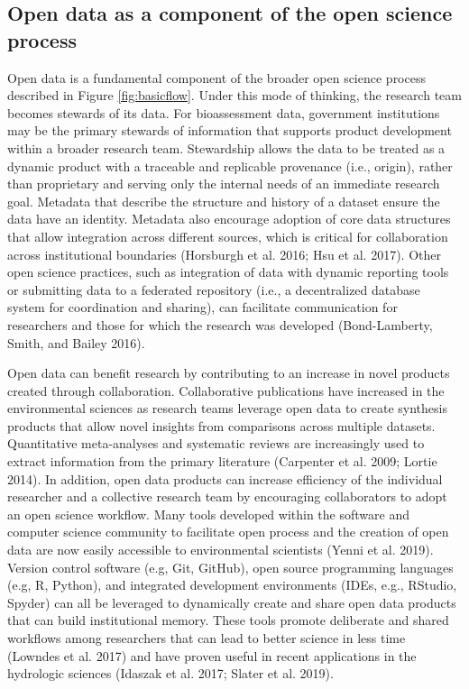 \documentclass[fleqn,10pt,lineno]{wlpeerj} %
\begin{document}
\hypertarget{open-data-as-a-component-of-the-open-science-process}{%
\subsection{Open data as a component of the open science process}\label{open-data-as-a-component-of-the-open-science-process}}

Open data is a fundamental component of the broader open science process described in Figure \ref{fig:basicflow}. Under this mode of thinking, the research team becomes stewards of its data. For bioassessment data, government institutions may be the primary stewards of information that supports product development within a broader research team. Stewardship allows the data to be treated as a dynamic product with a traceable and replicable provenance (i.e., origin), rather than proprietary and serving only the internal needs of an immediate research goal. Metadata that describe the structure and history of a dataset ensure the data have an identity. Metadata also encourage adoption of core data structures that allow integration across different sources, which is critical for collaboration across institutional boundaries (Horsburgh et al. 2016; Hsu et al. 2017). Other open science practices, such as integration of data with dynamic reporting tools or submitting data to a federated repository (i.e., a decentralized database system for coordination and sharing), can facilitate communication for researchers and those for which the research was developed (Bond-Lamberty, Smith, and Bailey 2016).

Open data can benefit research by contributing to an increase in novel products created through collaboration. Collaborative publications have increased in the environmental sciences as research teams leverage open data to create synthesis products that allow novel insights from comparisons across multiple datasets. Quantitative meta-analyses and systematic reviews are increasingly used to extract information from the primary literature (Carpenter et al. 2009; Lortie 2014). In addition, open data products can increase efficiency of the individual researcher and a collective research team by encouraging collaborators to adopt an open science workflow. Many tools developed within the software and computer science community to facilitate open process and the creation of open data are now easily accessible to environmental scientists (Yenni et al. 2019). Version control software (e.g, Git, GitHub), open source programming languages (e.g, R, Python), and integrated development environments (IDEs, e.g., RStudio, Spyder) can all be leveraged to dynamically create and share open data products that can build institutional memory. These tools promote deliberate and shared workflows among researchers that can lead to better science in less time (Lowndes et al. 2017) and have proven useful in recent applications in the hydrologic sciences (Idaszak et al. 2017; Slater et al. 2019).
\end{document}
